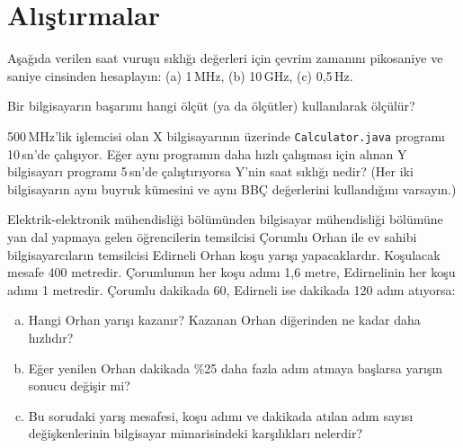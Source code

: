 \section*{Alıştırmalar}
\label{sec:basarim-alistirmalar}

\begin{alistirma}[\kolay]
Aşağıda verilen saat vuruşu sıklığı değerleri için çevrim zamanını pikosaniye ve saniye cinsinden hesaplayın: (a) 1\,MHz, (b) 10\,GHz, (c) 0,5\,Hz.
\end{alistirma}

\begin{alistirma}[\kolay]
Bir bilgisayarın başarımı hangi ölçüt (ya da ölçütler) kullanılarak ölçülür?
\end{alistirma}

\begin{alistirma}[\kolay]
500\,MHz'lik işlemcisi olan X bilgisayarının üzerinde \texttt{Calculator.java} programı 10\,sn'de çalışıyor. Eğer aynı programın daha hızlı çalışması için alınan Y bilgisayarı programı 5\,sn'de çalıştırıyorsa Y'nin saat sıklığı nedir? (Her iki bilgisayarın aynı buyruk kümesini ve aynı BBÇ değerlerini kullandığını varsayın.)
\end{alistirma}

\begin{alistirma}[\orta]
Elektrik-elektronik mühendisliği bölümünden bilgisayar mühendisliği bölümüne yan dal yapmaya gelen öğrencilerin temsilcisi Çorumlu Orhan ile ev sahibi bilgisayarcıların temsilcisi Edirneli Orhan koşu yarışı yapacaklardır. Koşulacak mesafe 400 metredir. Çorumlunun her koşu adımı 1,6 metre, Edirnelinin her koşu adımı 1 metredir. Çorumlu dakikada 60, Edirneli ise dakikada 120 adım atıyorsa:
\begin{enumerate}[(a)]
    \item Hangi Orhan yarışı kazanır? Kazanan Orhan diğerinden ne kadar daha hızlıdır?
    \item Eğer yenilen Orhan dakikada \%25 daha fazla adım atmaya başlarsa yarışın sonucu değişir mi?
    \item Bu sorudaki yarış mesafesi, koşu adımı ve dakikada atılan adım sayısı değişkenlerinin bilgisayar mimarisindeki karşılıkları nelerdir?
\end{enumerate}
\end{alistirma}


